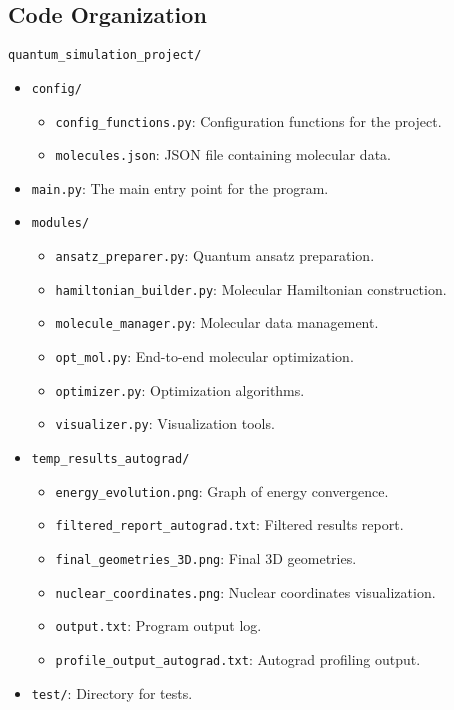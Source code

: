 \subsection{Code Organization}
\begin{ProjectStructure}
  \texttt{quantum\_simulation\_project/}
  \begin{itemize}[label={}, left=1em]
      \item \texttt{config/}
      \begin{itemize}[label={}, left=2em]
          \item \texttt{config\_functions.py}: Configuration functions for the project.
          \item \texttt{molecules.json}: JSON file containing molecular data.
      \end{itemize}
      \item \texttt{main.py}: The main entry point for the program.
      \item \texttt{modules/}
      \begin{itemize}[label={}, left=2em]
          \item \texttt{ansatz\_preparer.py}: Quantum ansatz preparation.
          \item \texttt{hamiltonian\_builder.py}: Molecular Hamiltonian construction.
          \item \texttt{molecule\_manager.py}: Molecular data management.
          \item \texttt{opt\_mol.py}: End-to-end molecular optimization.
          \item \texttt{optimizer.py}: Optimization algorithms.
          \item \texttt{visualizer.py}: Visualization tools.
      \end{itemize}
      \item \texttt{temp\_results\_autograd/}
      \begin{itemize}[label={}, left=2em]
          \item \texttt{energy\_evolution.png}: Graph of energy convergence.
          \item \texttt{filtered\_report\_autograd.txt}: Filtered results report.
          \item \texttt{final\_geometries\_3D.png}: Final 3D geometries.
          \item \texttt{nuclear\_coordinates.png}: Nuclear coordinates visualization.
          \item \texttt{output.txt}: Program output log.
          \item \texttt{profile\_output\_autograd.txt}: Autograd profiling output.
      \end{itemize}
      \item \texttt{test/}: Directory for tests.
  \end{itemize}
\end{ProjectStructure}

